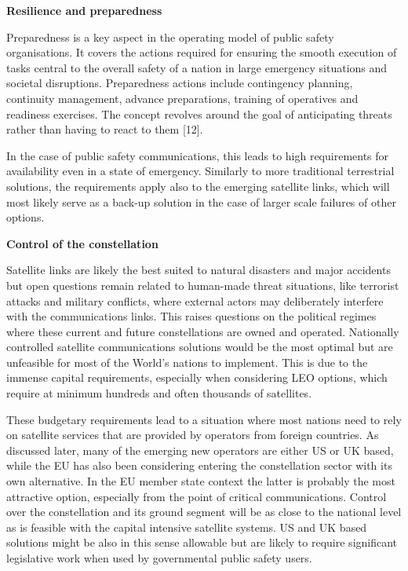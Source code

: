 \documentclass[english, 12pt, a4paper, elec, utf8, a-1b, online]{aaltothesis}
\begin{document}
\textbf{Resilience and preparedness}

Preparedness is a key aspect in the operating model of public safety organisations. It covers the actions required for ensuring the smooth execution of tasks central to the overall safety of a nation in large emergency situations and societal disruptions. Preparedness actions include contingency planning, continuity management, advance preparations, training of operatives and readiness exercises. The concept revolves around the goal of anticipating threats rather than having to react to them [12].

In the case of public safety communications, this leads to high requirements for availability even in a state of emergency. Similarly to more traditional terrestrial solutions, the requirements apply also to the emerging satellite links, which will most likely serve as a back-up solution in the case of larger scale failures of other options.

\textbf{Control of the constellation}

Satellite links are likely the best suited to natural disasters and major accidents but open questions remain related to human-made threat situations, like terrorist attacks and military conflicts, where external actors may deliberately interfere with the communications links. This raises questions on the political regimes where these current and future constellations are owned and operated. Nationally controlled satellite communications solutions would be the most optimal but are unfeasible for most of the World’s nations to implement. This is due to the immense capital requirements, especially when considering LEO options, which require at minimum hundreds and often thousands of satellites.

These budgetary requirements lead to a situation where most nations need to rely on satellite services that are provided by operators from foreign countries. As discussed later, many of the emerging new operators are either US or UK based, while the EU has also been considering entering the constellation sector with its own alternative. In the EU member state context the latter is probably the most attractive option, especially from the point of critical communications. Control over the constellation and its ground segment will be as close to the national level as is feasible with the capital intensive satellite systems. US and UK based solutions might be also in this sense allowable but are likely to require significant legislative work when used by governmental public safety users.
\end{document}
